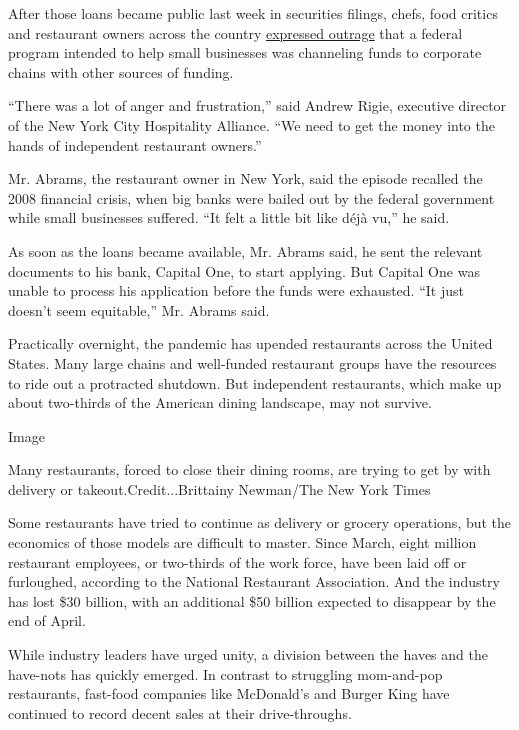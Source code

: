 After those loans became public last week in securities filings, chefs,
food critics and restaurant owners across the country
\href{https://www.esquire.com/food-drink/restaurants/a32190986/cares-act-chains-independent-restaurants/}{expressed
outrage} that a federal program intended to help small businesses was
channeling funds to corporate chains with other sources of funding.

``There was a lot of anger and frustration,'' said Andrew Rigie,
executive director of the New York City Hospitality Alliance. ``We need
to get the money into the hands of independent restaurant owners.''

Mr. Abrams, the restaurant owner in New York, said the episode recalled
the 2008 financial crisis, when big banks were bailed out by the federal
government while small businesses suffered. ``It felt a little bit like
déjà vu,'' he said.

As soon as the loans became available, Mr. Abrams said, he sent the
relevant documents to his bank, Capital One, to start applying. But
Capital One was unable to process his application before the funds were
exhausted. ``It just doesn't seem equitable,'' Mr. Abrams said.

Practically overnight, the pandemic has upended restaurants across the
United States. Many large chains and well-funded restaurant groups have
the resources to ride out a protracted shutdown. But independent
restaurants, which make up about two-thirds of the American dining
landscape, may not survive.

Image

Many restaurants, forced to close their dining rooms, are trying to get
by with delivery or takeout.Credit...Brittainy Newman/The New York Times

Some restaurants have tried to continue as delivery or grocery
operations, but the economics of those models are difficult to master.
Since March, eight million restaurant employees, or two-thirds of the
work force, have been laid off or furloughed, according to the National
Restaurant Association. And the industry has lost \$30 billion, with an
additional \$50 billion expected to disappear by the end of April.

While industry leaders have urged unity, a division between the haves
and the have-nots has quickly emerged. In contrast to struggling
mom-and-pop restaurants, fast-food companies like McDonald's and Burger
King have continued to record decent sales at their drive-throughs.

